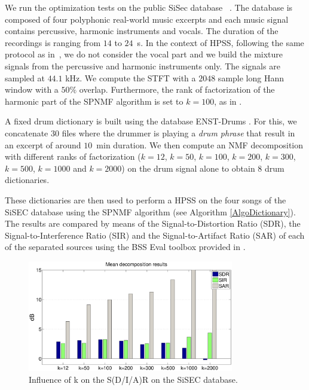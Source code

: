\documentclass{article}
\begin{document}
We run the optimization tests on the public SiSec database ~\cite{SiSec10}. The database is composed of four polyphonic real-world music excerpts and each music signal contains percussive, harmonic instruments and vocals. The duration of the recordings is ranging from $14$ to $24$~s. In the context of HPSS, following the same protocol as in~\cite{canadas2014percussive}, we do not consider the vocal part and we build the mixture signals from the percussive and harmonic instruments only. The signals are sampled at $44.1$ kHz. We compute the STFT with a $2048$ sample long Hann window with a $50\%$ overlap. Furthermore, the rank of factorization of the harmonic part of the SPNMF algorithm is set to $k=100$, as in \cite{larocheJournal}.

A fixed drum dictionary is built using the database ENST-Drums \cite{gillet2006enst}. For this, we  concatenate $30$ files where the drummer is playing a \emph{drum phrase} that result in an excerpt of around $10$~min duration. We then compute an NMF decomposition with different ranks of factorization ($k=12$, $k=50$, $k=100$, $k=200$, $k=300$, $k=500$, $k=1000$ and $k=2000$) on the drum signal alone to obtain $8$ drum dictionaries.

These dictionaries are then used to perform a HPSS on the four songs of the SiSEC database using the SPNMF algorithm (see Algorithm \ref{AlgoDictionary}). The results are compared by means of the Signal-to-Distortion Ratio (SDR), the Signal-to-Interference Ratio (SIR) and the Signal-to-Artifact Ratio (SAR) of each of the separated sources using the BSS Eval toolbox provided in \cite{bsseval}.

\begin{figure}[h]

  \centering 
  \includegraphics[width=9cm]{figs/AllDictSizeISMIR.eps}
  \caption{\label{dictsize}Influence of k on the S(D/I/A)R on the SiSEC database.}
  
\end{figure}
\end{document}
